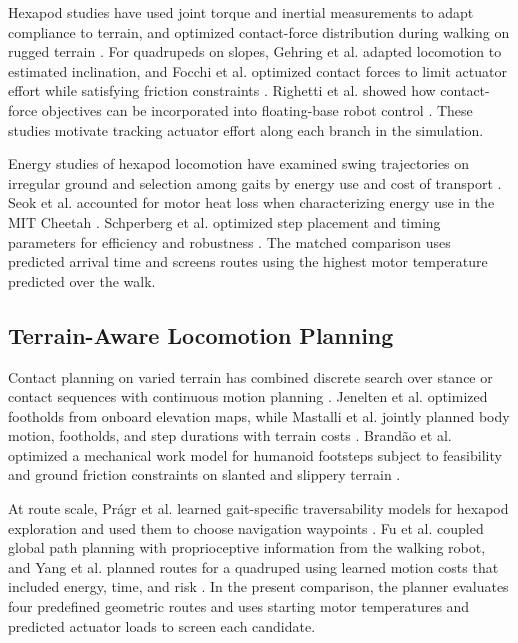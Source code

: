\documentclass{ieeeaccess}
\begin{document}
Hexapod studies have used joint torque and inertial measurements to adapt compliance to terrain, and optimized contact-force distribution during walking on rugged terrain \cite{zhao2021,ding2024}. For quadrupeds on slopes, Gehring et al. adapted locomotion to estimated inclination, and Focchi et al. optimized contact forces to limit actuator effort while satisfying friction constraints \cite{gehring2015,focchi2017}. Righetti et al. showed how contact-force objectives can be incorporated into floating-base robot control \cite{righetti2013}. These studies motivate tracking actuator effort along each branch in the simulation.

Energy studies of hexapod locomotion have examined swing trajectories on irregular ground and selection among gaits by energy use and cost of transport \cite{luneckas2019,luneckas2021}. Seok et al. accounted for motor heat loss when characterizing energy use in the MIT Cheetah \cite{seok2015}. Schperberg et al. optimized step placement and timing parameters for efficiency and robustness \cite{schperberg2025}. The matched comparison uses predicted arrival time and screens routes using the highest motor temperature predicted over the walk.

\subsection{Terrain-Aware Locomotion Planning}

Contact planning on varied terrain has combined discrete search over stance or contact sequences with continuous motion planning \cite{hauser2008,valouch2021}. Jenelten et al. optimized footholds from onboard elevation maps, while Mastalli et al. jointly planned body motion, footholds, and step durations with terrain costs \cite{jenelten2020,mastalli2020}. Brandão et al. optimized a mechanical work model for humanoid footsteps subject to feasibility and ground friction constraints on slanted and slippery terrain \cite{brandao2016}.

At route scale, Prágr et al. learned gait-specific traversability models for hexapod exploration and used them to choose navigation waypoints \cite{pragr2022}. Fu et al. coupled global path planning with proprioceptive information from the walking robot, and Yang et al. planned routes for a quadruped using learned motion costs that included energy, time, and risk \cite{fu2022,yang2021}. In the present comparison, the planner evaluates four predefined geometric routes and uses starting motor temperatures and predicted actuator loads to screen each candidate.
\end{document}
